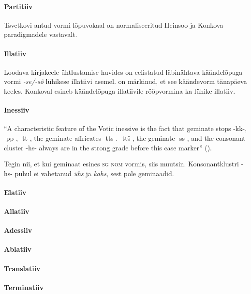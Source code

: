 \documentclass[12pt,a4paper]{article}
\begin{document}
\paragraph*{Partitiiv}
Tsvetkovi antud vormi lõpuvokaal on normaliseeritud Heinsoo ja Konkova paradigmadele vastavalt.

\paragraph*{Illatiiv}
Loodava kirjakeele ühtlustamise huvides on eelistatud läbinähtava käändelõpuga vormi \textit{-se/-sõ} lühikese illatiivi asemel. \cite[247]{markus_comitative_2014} on märkinud, et see käändevorm tänapäeva keeles. Konkoval esineb käändelõpuga illatiivile rööpvormina ka lühike illatiiv. 

\paragraph*{Inessiiv}

``A characteristic feature of the Votic inessive is the fact that
geminate stops -kk-, -pp-, -tt-, the geminate affricates -tts-.
-ttš-, the geminate -ss-, and the consonant cluster -hs- always
are in the strong grade before this case marker'' (\cite[23]{ariste_grammar_1968}).

Tegin nii, et kui geminaat esines \textsc{sg nom} vormis, siis muutsin. Konsonant\-klustri -hs- puhul ei vahetanud \textit{ühs} ja \textit{kahs}, sest pole geminaadid.

\paragraph*{Elatiiv}

\paragraph*{Allatiiv}
\paragraph*{Adessiiv}
\paragraph*{Ablatiiv}

\paragraph*{Translatiiv}
\paragraph*{Terminatiiv}
\end{document}
